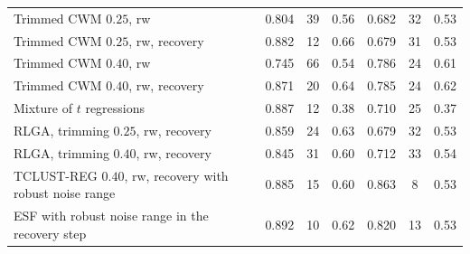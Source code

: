 \begin{tabular}{lcccccc}
Trimmed CWM $0.25$, rw & 0.804 & 39 & 0.56 & 0.682 & 32 & 0.53 \\
Trimmed CWM $0.25$, rw, recovery & 0.882 & 12 & 0.66 & 0.679 & 31 & 0.53 \\
Trimmed CWM $0.40$, rw & 0.745 & 66 & 0.54 & 0.786 & 24 & 0.61 \\
Trimmed CWM $0.40$, rw, recovery & 0.871 & 20 & 0.64 & 0.785 & 24 & 0.62 \\
Mixture of $t$ regressions & 0.887 & 12 & 0.38 & 0.710 & 25 & 0.37 \\
RLGA, trimming $0.25$, rw, recovery & 0.859 & 24 & 0.63 & 0.679 & 32 & 0.53 \\
RLGA, trimming $0.40$, rw, recovery & 0.845 & 31 & 0.60 & 0.712 & 33 & 0.54 \\
TCLUST-REG $0.40$, rw, recovery with robust noise range & 0.885 & 15 & 0.60 & 0.863 & 8 & 0.53 \\
ESF with robust noise range in the recovery step & 0.892 & 10 & 0.62 & 0.820 & 13 & 0.53 \\
\bottomrule
\end{tabular}